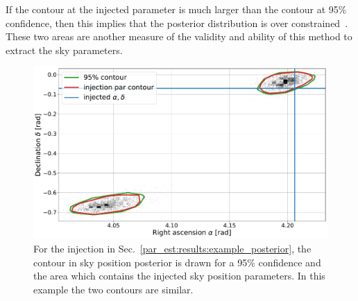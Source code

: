 If the
contour at the injected parameter is much larger than the contour at 95\%
confidence, then this implies that the posterior distribution is over
constrained~.  These two areas are another measure of the validity and ability of this
method to extract the sky parameters. 
%
\begin{figure}[ht]
    \centering
    \includegraphics[width=\linewidth]{C5_parameter/skyarea_example.pdf}
    \caption[Area of sky at 95\% confidence]{For the injection in
Sec.~\ref{par_est:results:example_posterior}, the contour in sky position
posterior is drawn for a 95\% confidence and the area which contains the
injected sky position parameters. In this example the two contours are
similar.~} \label{par_est:results:sky_area_example}
\end{figure}

